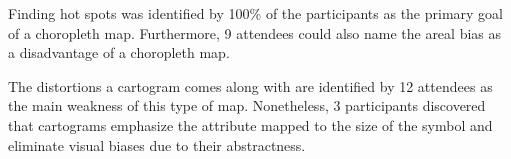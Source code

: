 Finding hot spots was identified by 100\% of the participants as the primary goal of a choropleth map. Furthermore, 9 attendees could also name the areal bias as a disadvantage of a choropleth map.

The distortions a cartogram comes along with are identified by 12 attendees as the main weakness of this type of map. Nonetheless, 3 participants discovered that cartograms emphasize the attribute mapped to the size of the symbol and eliminate visual biases due to their abstractness.